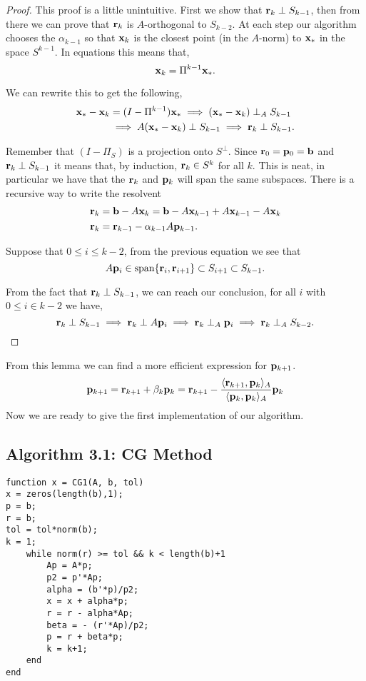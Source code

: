 \documentclass{article}
\newcommand{\bx}{{\bf x}}
\newcommand{\bb}{{\bf b}}
\newcommand{\br}{{\bf r}}
\newcommand{\bp}{{\bf p}}
\newcommand{\beq}{\begin{equation}}
\newcommand{\eeq}{\end{equation}}
\theoremstyle{remark}
\begin{document}
\begin{proof} This proof is a little unintuitive. First we show that $\br_k \perp S_{k-1}$, then from there we can prove that $\br_k$ is $A$-orthogonal to $S_{k-2}$.  At each step our algorithm chooses the $\alpha_{k-1}$ so that $\bx_k$ is the closest point (in the $A$-norm) to $\bx_*$ in the space $S^{k-1}$. In equations this means that,
\beq 
\bx_k = \Pi^{k-1} \bx_*.
\eeq

We can rewrite this to get the following,
\begin{align}
\bx_* - \bx_k &= (I-\Pi^{k-1})\bx_* \implies (\bx_* - \bx_k) \perp_A S_{k-1} \\
&\implies A(\bx_* - \bx_k) \perp S_{k-1} 
\implies \br_k \perp S_{k-1}. 
\end{align}

Remember that $(I - \Pi_S)$ is a projection onto $S^\perp$. Since $\br_0 = \bp_0 = \bb$ and $\br_k\perp S_{k-1}$ it means that, by induction, $\br_{k} \in S^k$ for all $k$. This is neat, in particular we have that the $\br_k$ and $\bp_k$ will span the same subspaces. There is a recursive way to write the resolvent
\begin{align}
\br_{k} &= \bb - A\bx_k = \bb-A\bx_{k-1} + A\bx_{k-1} - A\bx_k \\
\br_{k} &=  \br_{k-1} - \alpha_{k-1}A\bp_{k-1}. 
\end{align}

Suppose that $0 \leq i \leq k-2$, from the previous equation we see that
\beq 
A\bp_{i} \in \text{span}\{\br_{i}, \br_{i+1}\} \subset S_{i+1} \subset S_{k-1}.
\eeq

From the fact that $\br_k \perp S_{k-1}$, we can reach our conclusion, for all $i$ with $ 0 \leq i \in k-2$ we have,  
\beq
\br_k \perp S_{k-1} \implies \br_k \perp A\bp_{i} \implies \br_k \perp_A \bp_{i} \implies \br_k \perp_A S_{k-2}.
\eeq
\end{proof}

From this lemma we can find a more efficient expression for $\bp_{k+1}$.  
\beq 
\bp_{k+1} = \br_{k+1} + \beta_k \bp_{k} =\br_{k+1} -  \frac{\langle \br_{k+1} , \bp_{k}\rangle_A}{\langle \bp_{k}, \bp_{k}\rangle_A}\bp_{k}
\eeq
Now we are ready to give the first implementation of our algorithm. 

\subsection{Algorithm 3.1: CG Method}
\begin{lstlisting}
function x = CG1(A, b, tol)
x = zeros(length(b),1);
p = b;
r = b;
tol = tol*norm(b);
k = 1;
    while norm(r) >= tol && k < length(b)+1 
        Ap = A*p;
        p2 = p'*Ap;
        alpha = (b'*p)/p2;
        x = x + alpha*p;
        r = r - alpha*Ap;
        beta = - (r'*Ap)/p2;
        p = r + beta*p;
        k = k+1;
    end
end
\end{lstlisting}
\end{document}
